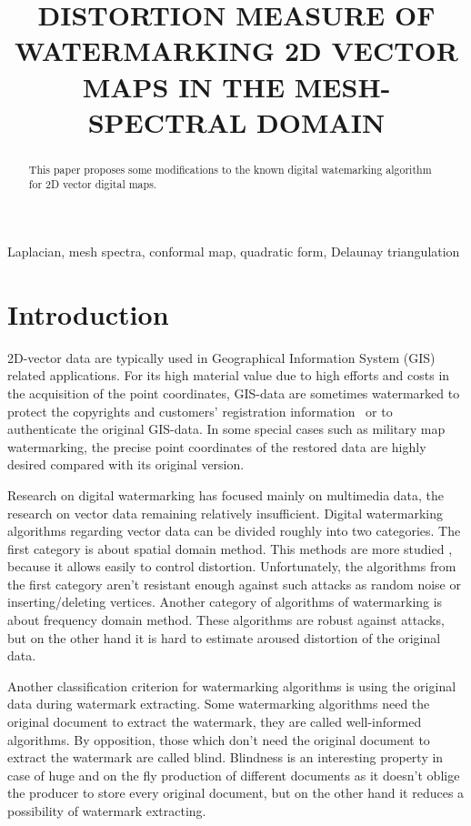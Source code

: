 \documentclass{article}
\title{DISTORTION MEASURE OF WATERMARKING 2D VECTOR MAPS IN THE MESH-SPECTRAL DOMAIN}
\begin{document}
%
\maketitle
%
\begin{abstract}
  This paper proposes some modifications to the known digital watemarking algorithm for 2D vector digital maps.  
\end{abstract}
%
\begin{keywords}
Laplacian, mesh spectra, conformal map, quadratic form, Delaunay triangulation
\end{keywords}
%
\section{Introduction}
\label{sec:intro}
2D-vector data are typically used in Geographical Information System (GIS) related applications. For its high material value due to high efforts and costs in the acquisition of the point coordinates, 
GIS-data are sometimes watermarked to protect the copyrights and customers’ registration information~\cite{Voight} or to authenticate the original GIS-data. In some special cases such as military map watermarking, 
the precise point coordinates of the restored data are highly desired compared with its original version.  

Research on digital watermarking has focused mainly on multimedia data, the research on vector data remaining relatively insufficient. 
Digital watermarking algorithms regarding vector data can be divided roughly into two categories. The first category is about spatial domain method. This methods are more studied \cite{Voight, Kim, Chang, Bazin}, 
because it allows easily to control distortion. Unfortunately, the algorithms from the first category aren't resistant enough against such attacks as random noise or inserting/deleting vertices.
Another category of algorithms of watermarking is about frequency domain method. These algorithms \cite{Ohbuchi, Ohbuchi3D, Praun} are robust against attacks, 
but on the other hand it is hard to estimate aroused distortion of the original data.
 
Another classification criterion for watermarking algorithms is using the original data during watermark extracting. Some watermarking algorithms need the original document to extract the watermark, 
they are called well-informed algorithms. By opposition, those which don’t need the original document to extract the watermark are called blind.
Blindness is an interesting property in case of huge and on the fly production of different documents as it doesn't oblige the producer to store every original document, 
but on the other hand it reduces a possibility of watermark extracting.
\end{document}
